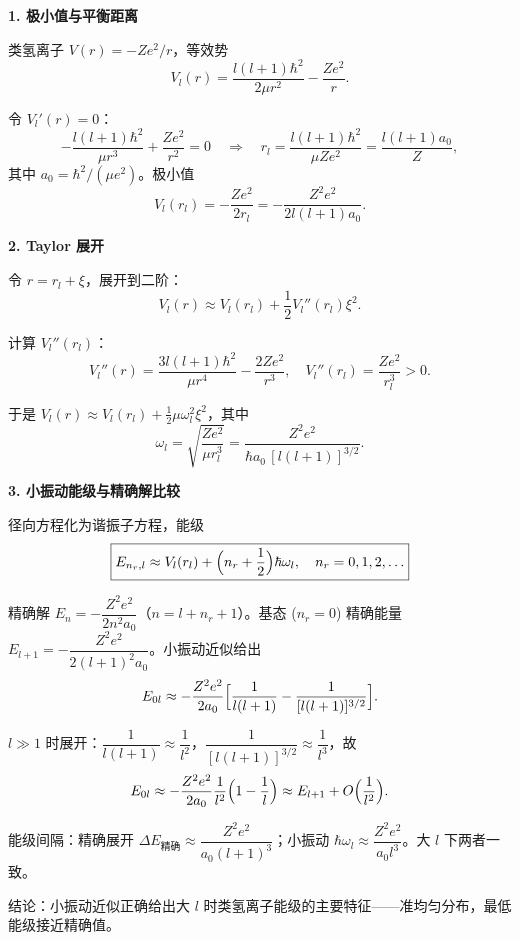 \begin{derivationbox}[标准解题过程]
\textbf{1. 极小值与平衡距离}

类氢离子 $V(r)=-Ze^2/r$，等效势
\[
V_l(r)=\frac{l(l+1)\hbar^2}{2\mu r^2}-\frac{Ze^2}{r}.
\]

令 $V_l'(r)=0$：
\[
-\frac{l(l+1)\hbar^2}{\mu r^3}+\frac{Ze^2}{r^2}=0\quad\Rightarrow\quad r_l=\frac{l(l+1)\hbar^2}{\mu Ze^2}=\frac{l(l+1)a_0}{Z},
\]
其中 $a_0=\hbar^2/(\mu e^2)$。极小值
\[
V_l(r_l)=-\frac{Ze^2}{2r_l}=-\frac{Z^2e^2}{2l(l+1)a_0}.
\]

\textbf{2. Taylor 展开}

令 $r=r_l+\xi$，展开到二阶：
\[
V_l(r)\approx V_l(r_l)+\frac12V_l''(r_l)\xi^2.
\]

计算 $V_l''(r_l)$：
\[
V_l''(r)=\frac{3l(l+1)\hbar^2}{\mu r^4}-\frac{2Ze^2}{r^3},\quad V_l''(r_l)=\frac{Ze^2}{r_l^3}>0.
\]

于是 $V_l(r)\approx V_l(r_l)+\frac12\mu\omega_l^2\xi^2$，其中
\begin{equation}
\boxed{\omega_l=\sqrt{\frac{Ze^2}{\mu r_l^3}}=\frac{Z^2e^2}{\hbar a_0\,[l(l+1)]^{3/2}}.}
\end{equation}

\textbf{3. 小振动能级与精确解比较}

径向方程化为谐振子方程，能级
\begin{equation}
\boxed{E_{n_r,l}\approx V_l(r_l)+\Bigl(n_r+\frac12\Bigr)\hbar\omega_l,\quad n_r=0,1,2,\ldots}
\end{equation}

精确解 $E_n=-\dfrac{Z^2e^2}{2n^2a_0}$（$n=l+n_r+1$）。基态 ($n_r=0$) 精确能量 $E_{l+1}=-\dfrac{Z^2e^2}{2(l+1)^2a_0}$。小振动近似给出
\[
E_{0l}\approx-\frac{Z^2e^2}{2a_0}\Bigl[\frac{1}{l(l+1)}-\frac{1}{[l(l+1)]^{3/2}}\Bigr].
\]

$l\gg1$ 时展开：$\dfrac{1}{l(l+1)}\approx\dfrac{1}{l^2}$，$\dfrac{1}{[l(l+1)]^{3/2}}\approx\dfrac{1}{l^3}$，故
\[
E_{0l}\approx-\frac{Z^2e^2}{2a_0}\frac{1}{l^2}\Bigl(1-\frac{1}{l}\Bigr)\approx E_{l+1}+O\Bigl(\frac{1}{l^2}\Bigr).
\]

能级间隔：精确展开 $\Delta E_{\text{精确}}\approx\dfrac{Z^2e^2}{a_0(l+1)^3}$；小振动 $\hbar\omega_l\approx\dfrac{Z^2e^2}{a_0l^3}$。大 $l$ 下两者一致。

结论：小振动近似正确给出大 $l$ 时类氢离子能级的主要特征——准均匀分布，最低能级接近精确值。
\end{derivationbox}


